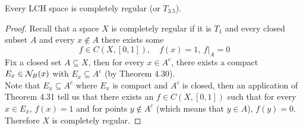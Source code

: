 \documentclass[../../main.tex]{subfiles}
\begin{document}
\begin{wts}
    Every LCH space is completely regular (or $T_{3.5}$).
\end{wts}
\begin{proof}
    Recall that a space $X$ is completely regular if it is $T_1$ and every closed subset $A$ and every $x\notin A$ there exists some 
    \[
    f\in C(X,[0,1]),\quad f(x)=1,\:f|_A = 0
    \]
    Fix a closed set $A\subseteq X$, then for every $x\in A^c$, there exists a compact $E_x\in\mathcal{N}_B({x})$ with $E_x\subseteq A^c$ (by Theorem 4.30).\\ 
    
    Note that $E_x\subseteq A^c$ where $E_x$ is compact and $A^c$ is closed, then an application of Theorem 4.31 tell us that there exists an $f\in C(X,[0,1])$ such that for every $x\in E_x$, $f(x)=1$ and for points $y\notin A^c$ (which means that $y\in A$), $f(y)=0$. Therefore $X$ is completely regular.
\end{proof}
\end{document}
